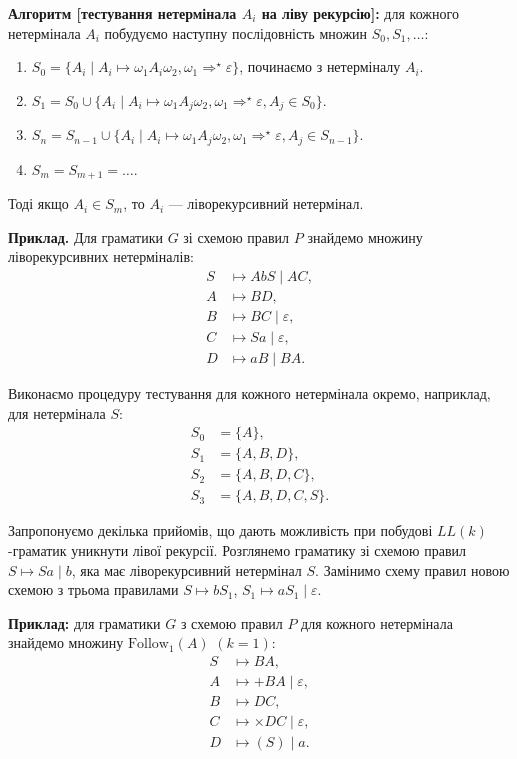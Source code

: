 \textbf{Алгоритм [тестування нетермінала $A_i$ на ліву рекурсію]:} для кожного нетермінала $A_i$ побудуємо наступну послідовність множин $S_0, S_1, \ldots$:
\begin{enumerate}
	\item $S_0 = \{A_i \mid A_i \mapsto \omega_1 A_i \omega_2, \omega_1 \Rightarrow^\star \varepsilon \}$, починаємо з нетерміналу $A_i$.
	\item $S_1 = S_0 \cup \{ A_i \mid A_i \mapsto \omega_1 A_j \omega_2, \omega_1 \Rightarrow^\star \varepsilon, A_j \in S_0\}$.
	\item $S_n = S_{n-1} \cup \{ A_i \mid A_i \mapsto \omega_1 A_j \omega_2, \omega_1 \Rightarrow^\star \varepsilon, A_j \in S_{n-1}\}$.
	\item $S_m = S_{m + 1} = \ldots$.
\end{enumerate}

Тоді якщо $A_i \in S_m$, то $A_i$ --- ліворекурсивний нетермінал.\medskip

\textbf{Приклад.} Для граматики $G$ зі схемою правил $P$ знайдемо множину ліворекурсивних нетерміналів:
\begin{align*}
	S &\mapsto AbS \mid AC, \\
	A &\mapsto BD, \\
	B &\mapsto BC \mid \varepsilon, \\
	C &\mapsto Sa \mid \varepsilon, \\
	D &\mapsto aB \mid BA.
\end{align*}

Виконаємо процедуру тестування для кожного нетермінала окремо, наприклад, для нетермінала $S$: 
\begin{align*}
	S_0 &= \{A\}, \\
	S_1 &= \{A, B, D\}, \\
	S_2 &= \{A, B, D, C\}, \\
	S_3 &= \{A, B, D, C, S\}.
\end{align*}

Запропонуємо декілька прийомів, що дають можливість при побудові $LL(k)$-граматик уникнути лівої рекурсії. Розглянемо граматику зі схемою правил $S \mapsto Sa \mid b$, яка має ліворекурсивний нетермінал $S$. Замінимо схему правил новою схемою з трьома правилами $S \mapsto bS_1$, $S_1 \mapsto aS_1 \mid \varepsilon$. \medskip

\textbf{Приклад:} для граматики $G$ з схемою правил $P$ для кожного нетермінала знайдемо множину $\text{Follow}_1(A)$ $(k=1)$:
\begin{align*}
	S &\mapsto BA, \\
	A &\mapsto +BA \mid \varepsilon, \\
	B &\mapsto DC, \\
	C &\mapsto \times DC \mid \varepsilon, \\
	D &\mapsto (S) \mid a.
\end{align*}

